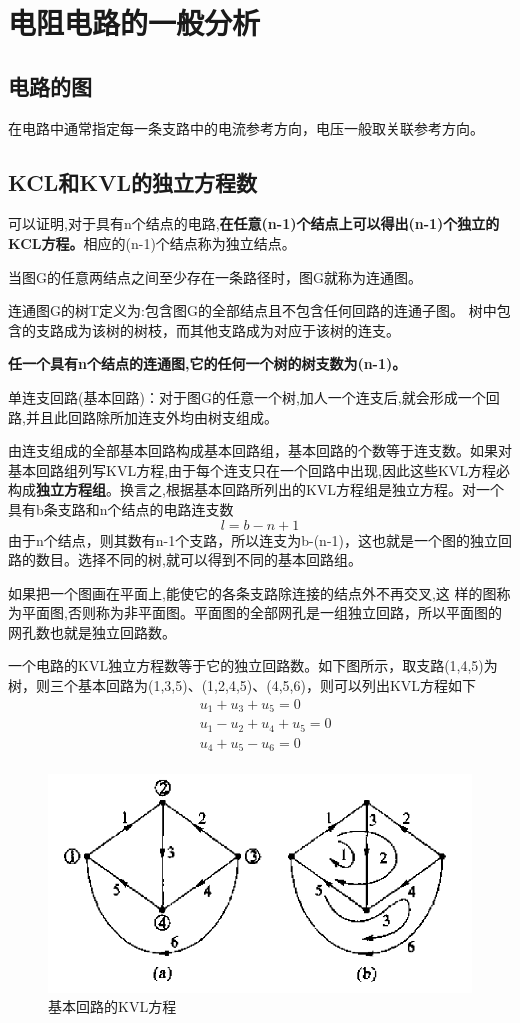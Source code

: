 \documentclass[11pt,a4paper,oneside]{book}
\begin{document}
\chapter{电阻电路的一般分析}
\section{电路的图}
在电路中通常指定每一条支路中的电流参考方向，电压一般取关联参考方向。
\section{KCL和KVL的独立方程数}
可以证明,对于具有n个结点的电路,\textbf{在任意(n-1)个结点上可以得出(n-1)个独立的KCL方程。}相应的(n-1)个结点称为独立结点。

当图G的任意两结点之间至少存在一条路径时，图G就称为连通图。

连通图G的树T定义为:包含图G的全部结点且不包含任何回路的连通子图。
树中包含的支路成为该树的树枝，而其他支路成为对应于该树的连支。

\textbf{任一个具有n个结点的连通图,它的任何一个树的树支数为(n-1)。}

单连支回路(基本回路)：对于图G的任意一个树,加人一个连支后,就会形成一个回路,并且此回路除所加连支外均由树支组成。

由连支组成的全部基本回路构成基本回路组，基本回路的个数等于连支数。如果对基本回路组列写KVL方程,由于每个连支只在一个回路中出现,因此这些KVL方程必构成\textbf{独立方程组}。换言之,根据基本回路所列出的KVL方程组是独立方程。对一个具有b条支路和n个结点的电路连支数
\begin{equation}
	l=b-n+1
\end{equation}由于n个结点，则其数有n-1个支路，所以连支为b-(n-1)，这也就是一个图的独立回路的数目。选择不同的树,就可以得到不同的基本回路组。

如果把一个图画在平面上,能使它的各条支路除连接的结点外不再交叉,这
样的图称为平面图,否则称为非平面图。平面图的全部网孔是一组独立回路，所以平面图的网孔数也就是独立回路数。

一个电路的KVL独立方程数等于它的独立回路数。如下图所示，取支路(1,4,5)为树，则三个基本回路为(1,3,5)、(1,2,4,5)、(4,5,6)，则可以列出KVL方程如下
\begin{equation}
	\begin{aligned}
		&u_1+u_3+u_5=0 \\
		&u_1-u_2+u_4+u_5=0 \\
		&u_4+u_5-u_6=0 \\
	\end{aligned}
\end{equation}
\begin{figure}[H]
	\centering
	\includegraphics[width=0.7\linewidth]{screenshot031}
	\caption{基本回路的KVL方程}
	\label{fig:screenshot031}
\end{figure}
\end{document}
